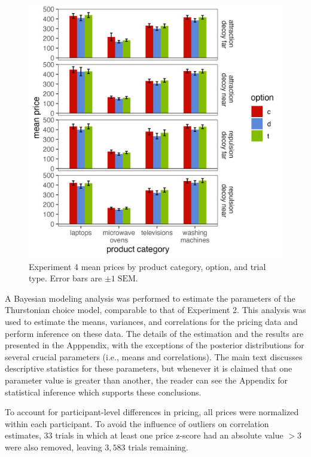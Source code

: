 \begin{figure}
    \includegraphics[width=130mm,scale=0.5]{figures/price_m_by_effect_category.jpeg}
    \caption{Experiment 4 mean prices by product category, option, and trial type. Error bars are $\pm 1\;\text{SEM}$.}
    \label{fig:price_m_by_effect_category}
\end{figure}

A Bayesian modeling analysis was performed to estimate the parameters of the Thurstonian choice model, comparable to that of Experiment 2. This analysis was used to estimate the means, variances, and correlations for the pricing data and perform inference on these data. The details of the estimation and the results are presented in the Apppendix, with the exceptions of the posterior distributions for several crucial parameters (i.e., means and correlations). The main text discusses descriptive statistics for these parameters, but whenever it is claimed that one parameter value is greater than another, the reader can see the Appendix for statistical inference which supports these conclusions. 

To account for participant-level differences in pricing, all prices were normalized within each participant. To avoid the influence of outliers on correlation estimates, $33$ trials in which at least one price z-score had an absolute value $>3$ were also removed, leaving $3,583$ trials remaining. 

